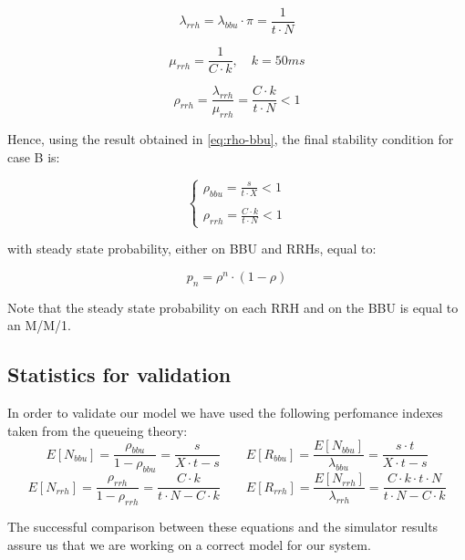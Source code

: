 \documentclass[11pt,a4paper,oneside, openright]{article}
\begin{document}
$$ \lambda_{rrh} = \lambda_{bbu} \cdot \pi = \frac{1}{t \cdot N} $$

$$ \mu_{rrh} = \frac{1}{C \cdot k}, \quad k = 50ms $$

\begin{equation} \label{eq:rho-rrh}
\rho_{rrh} = \frac{\lambda_{rrh}}{\mu_{rrh}} = \frac{C \cdot k}{t \cdot N} < 1
\end{equation}

Hence, using the result obtained in \ref{eq:rho-bbu}, the final stability condition for case B is:

$$ \begin{cases} \rho_{bbu} = \frac{s}{t \cdot X} < 1 \\ \\ \rho_{rrh} = \frac{C \cdot k}{t \cdot N} < 1 \end{cases} $$

with steady state probability, either on BBU and RRHs, equal to:

$$ p_{n} = \rho^n \cdot (1 - \rho) $$

Note that the steady state probability on each RRH and on the BBU is equal to an M/M/1.

\subsection{Statistics for validation}
In order to validate our model we have used the following perfomance indexes taken from the queueing theory:
\begin{equation}
E[N_{bbu}] = \frac{\rho_{bbu}}{1 - \rho_{bbu}} = \frac{s}{X \cdot t - s} \qquad E[R_{bbu}] = \frac{E[N_{bbu}]}{\lambda_{bbu}} =  \frac{s \cdot t}{X \cdot t - s}
\label{eq:response-time-bbu}
\end{equation}
\begin{equation}
E[N_{rrh}] = \frac{\rho_{rrh}}{1 - \rho_{rrh}} = \frac{C \cdot k}{t \cdot N - C \cdot k} \qquad E[R_{rrh}] = \frac{E[N_{rrh}]}{\lambda_{rrh}} = \frac{C \cdot k \cdot t \cdot N}{t \cdot N - C \cdot k}
\label{eq:response-time-rrh}
\end{equation}



The successful comparison between these equations and the simulator results assure us that we are working on a correct model for our system.
\end{document}
